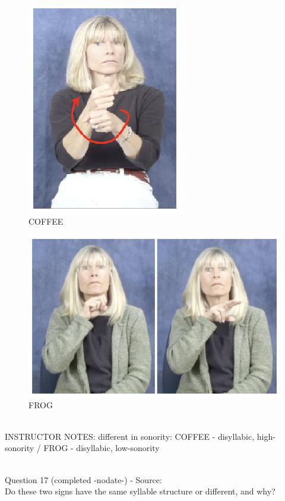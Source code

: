 \documentclass[12pt]{article}
\begin{document}
\begin{figure}[H]
\includegraphics{../images/asl_coffee.png}
\caption{COFFEE}
\end{figure}
\begin{figure}[H]
\includegraphics{../images/asl_frog.png}
\caption{FROG}
\end{figure}

~\\
INSTRUCTOR NOTES: different in sonority: COFFEE - disyllabic, high-sonority / FROG - disyllabic, low-sonority


~\\

{\large Question 17} (completed -nodate-) - Source: \\

Do these two signs have the same syllable structure or different, and why?\\
\end{document}
